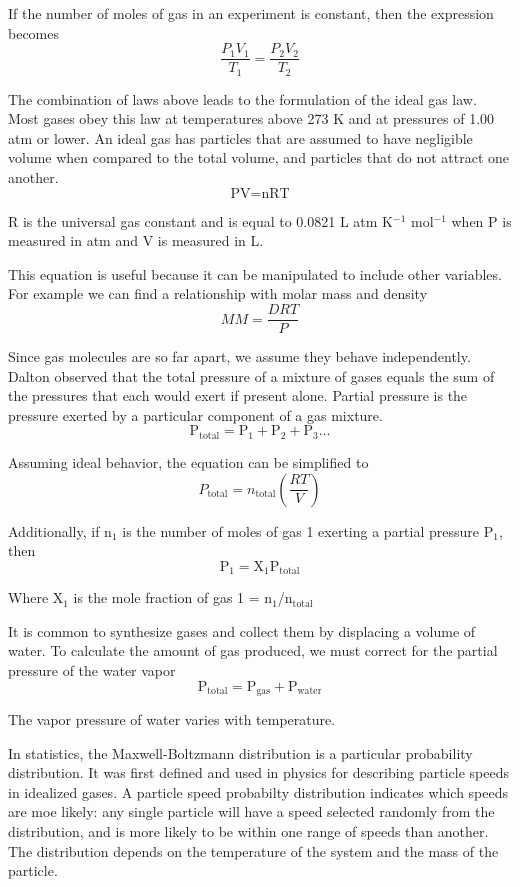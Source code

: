 \documentclass[../chem.tex]{subfiles}
\begin{document}
If the number of moles of gas in an experiment is constant, then the expression becomes 
\[\frac{P_1V_1}{T_1}=\frac{P_2V_2}{T_2}\]

The combination of laws above leads to the formulation of the ideal gas law. Most gases obey this law at temperatures above 273 K and at pressures of 1.00 atm or lower. 
An ideal gas has particles that are assumed to have negligible volume when compared to the total volume, and particles that do not attract one another.
\[\text{PV}=\text{nRT}\]

R is the universal gas constant and is equal to 0.0821 L atm K$^{-1}$ mol$^{-1}$ when P is measured in atm and V is measured in L. 

This equation is useful because it can be manipulated to include other variables. For example we can find a relationship with molar mass and density 
\[MM=\frac{DRT}{P}\]

Since gas molecules are so far apart, we assume they behave independently. Dalton observed that the total pressure of a mixture of gases equals the sum of the pressures that each would exert if present alone.
Partial pressure is the pressure exerted by a particular component of a gas mixture.
\[\text{P}_{\text{total}}=\text{P}_1+\text{P}_2+\text{P}_3\dots \]

Assuming ideal behavior, the equation can be simplified to 
\[P_{\text{total}}=n_{\text{total}}\left(\frac{RT}{V}\right) \]

Additionally, if n$_1$ is the number of moles of gas 1 exerting a partial pressure P$_1$, then 
\[\text{P}_1=\text{X}_1\text{P}_{\text{total}}\]

Where X$_1$ is the mole fraction of gas 1 = n$_1$/n$_{\text{total}}$

It is common to synthesize gases and collect them by displacing a volume of water. To calculate the amount of gas produced, we must correct for the partial pressure of the water vapor 
\[\text{P}_{\text{total}}=\text{P}_{\text{gas}}+\text{P}_{\text{water}}\]

The vapor pressure of water varies with temperature.

In statistics, the Maxwell-Boltzmann distribution is a particular probability distribution. It was first defined and used in physics for describing particle speeds in idealized gases.
A particle speed probabilty distribution indicates which speeds are moe likely: any single particle will have a speed selected randomly from the distribution, and is more likely to be within one range 
of speeds than another. The distribution depends on the temperature of the system and the mass of the particle.
\end{document}
